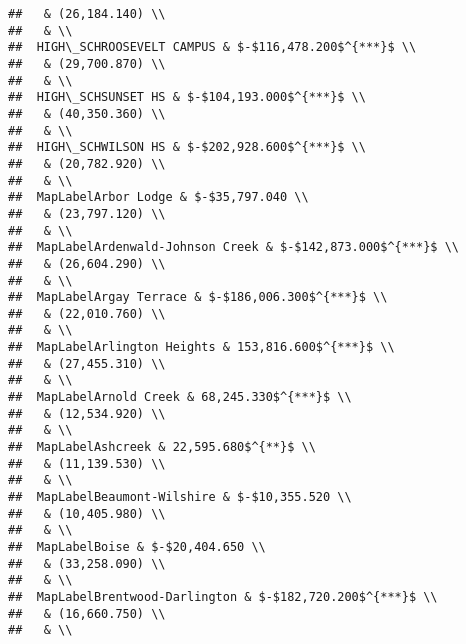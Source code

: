 \documentclass[]{article}
\begin{document}
\begin{verbatim}
##   & (26,184.140) \\ 
##   & \\ 
##  HIGH\_SCHROOSEVELT CAMPUS & $-$116,478.200$^{***}$ \\ 
##   & (29,700.870) \\ 
##   & \\ 
##  HIGH\_SCHSUNSET HS & $-$104,193.000$^{***}$ \\ 
##   & (40,350.360) \\ 
##   & \\ 
##  HIGH\_SCHWILSON HS & $-$202,928.600$^{***}$ \\ 
##   & (20,782.920) \\ 
##   & \\ 
##  MapLabelArbor Lodge & $-$35,797.040 \\ 
##   & (23,797.120) \\ 
##   & \\ 
##  MapLabelArdenwald-Johnson Creek & $-$142,873.000$^{***}$ \\ 
##   & (26,604.290) \\ 
##   & \\ 
##  MapLabelArgay Terrace & $-$186,006.300$^{***}$ \\ 
##   & (22,010.760) \\ 
##   & \\ 
##  MapLabelArlington Heights & 153,816.600$^{***}$ \\ 
##   & (27,455.310) \\ 
##   & \\ 
##  MapLabelArnold Creek & 68,245.330$^{***}$ \\ 
##   & (12,534.920) \\ 
##   & \\ 
##  MapLabelAshcreek & 22,595.680$^{**}$ \\ 
##   & (11,139.530) \\ 
##   & \\ 
##  MapLabelBeaumont-Wilshire & $-$10,355.520 \\ 
##   & (10,405.980) \\ 
##   & \\ 
##  MapLabelBoise & $-$20,404.650 \\ 
##   & (33,258.090) \\ 
##   & \\ 
##  MapLabelBrentwood-Darlington & $-$182,720.200$^{***}$ \\ 
##   & (16,660.750) \\ 
##   & \\ 

\end{verbatim}
\end{document}
